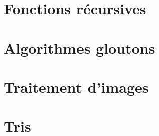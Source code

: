 \begin{multicols}{2}
\section{Fonctions récursives}
\renewcommand{\repExo}{../../Informatique/S1_Themes/05_FonctionsRecursives}

\renewcommand{\td}{01_AlgorithmesDichotomiques}
\graphicspath{{\repStyle/png/}{\repExo/\td/images/}}


\renewcommand{\td}{02_FiguresAlphaNumeriques}
\graphicspath{{\repStyle/png/}{\repExo/\td/images/}}


\renewcommand{\td}{03_Fractales}
\graphicspath{{\repStyle/png/}{\repExo/\td/images/}}


\renewcommand{\td}{04_EnumerationListes}
\graphicspath{{\repStyle/png/}{\repExo/\td/images/}}


\section{Algorithmes gloutons}
\renewcommand{\repExo}{../../Informatique/S1_Themes/06_Gloutons}

\renewcommand{\td}{01_RenduMonnaie}
\graphicspath{{\repStyle/png/}{\repExo/\td/images/}}


\renewcommand{\td}{02_AllocationSalles}
\graphicspath{{\repStyle/png/}{\repExo/\td/images/}}



\renewcommand{\td}{03_SelectionActivites}
\graphicspath{{\repStyle/png/}{\repExo/\td/images/}}



\section{Traitement d'images}
\renewcommand{\repExo}{../../Informatique/S1_Themes/07_Images}

\renewcommand{\td}{01_TraitementImages}
\graphicspath{{\repStyle/png/}{\repExo/\td/images/}}


\renewcommand{\td}{02_Convolution}
\graphicspath{{\repStyle/png/}{\repExo/\td/images/}}


\section{Tris}
\renewcommand{\repExo}{../../Informatique/S1_Themes/08_Tris}

\renewcommand{\td}{01_TriQuadratique}
\graphicspath{{\repStyle/png/}{\repExo/\td/images/}}


\renewcommand{\td}{02_TriFusion}
\graphicspath{{\repStyle/png/}{\repExo/\td/images/}}


\renewcommand{\td}{03_TriRapide}
\graphicspath{{\repStyle/png/}{\repExo/\td/images/}}


\renewcommand{\td}{04_TriComptage}
\graphicspath{{\repStyle/png/}{\repExo/\td/images/}}


\end{multicols}

%
%
%
%
%
%
